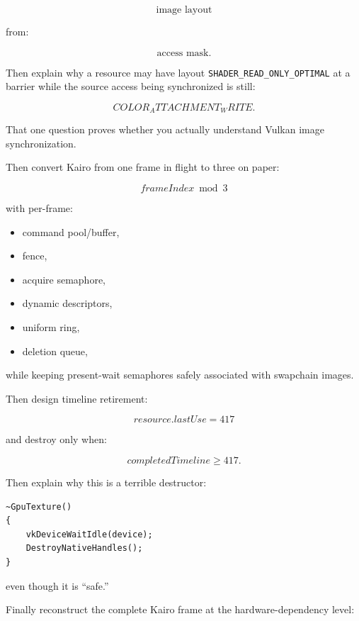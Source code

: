 \[
\text{image layout}
\]

from:

\[
\text{access mask}.
\]

Then explain why a resource may have layout \texttt{SHADER\_READ\_ONLY\_OPTIMAL} at a barrier while the source access being synchronized is still:

\[
COLOR_ATTACHMENT_WRITE.
\]

That one question proves whether you actually understand Vulkan image synchronization.

Then convert Kairo from one frame in flight to three on paper:

\[
frameIndex\bmod3
\]

with per-frame:

\begin{itemize}
\tightlist
\item
  command pool/buffer,
\item
  fence,
\item
  acquire semaphore,
\item
  dynamic descriptors,
\item
  uniform ring,
\item
  deletion queue,
\end{itemize}

while keeping present-wait semaphores safely associated with swapchain images.

Then design timeline retirement:

\[
resource.lastUse=417
\]

and destroy only when:

\[
completedTimeline\ge417.
\]

Then explain why this is a terrible destructor:

\begin{verbatim}
~GpuTexture()
{
    vkDeviceWaitIdle(device);
    DestroyNativeHandles();
}
\end{verbatim}

even though it is ``safe.''

Finally reconstruct the complete Kairo frame at the hardware-dependency level:

